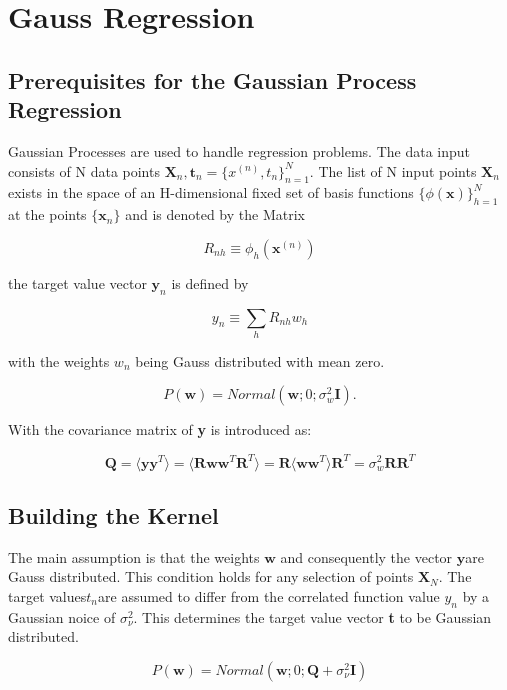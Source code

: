 \section{Gauss Regression}
\label{section:3.2}
\subsection{Prerequisites for the Gaussian Process Regression}
\label{subsection:3.2.1}

Gaussian Processes are used to handle regression problems. The data input consists of N data points $\textbf{X}_n,\textbf{t}_n  = \{x^{(n)},t_n\}_{n=1}^N$. The list of N input points  $\textbf{X}_n$ exists in the space of an H-dimensional fixed set of basis functions $ \{ \phi(\textbf{x})\}_{h=1}^N $ at the points $\{\textbf{x}_n\}$ and is denoted by the Matrix 

$$ 
R_{nh} \equiv  \phi_h(\textbf{x}^{(n)}) 
$$

the target value vector $\textbf{y}_n$ is defined by 

$$
y_n \equiv  \sum_h R_{nh} w_h
$$

with the weights $w_n$ being Gauss distributed with mean zero. 

$$
 P(\textbf{w}) = Normal(\textbf{w};0;\sigma_w^2\textbf{I}). 
$$

With  \cite[540]{GAP-info-theory} the covariance matrix of \textbf{y} is introduced as:

$$
\textbf{Q} 
= 
\langle 
\textbf{y} \textbf{y}^T \rangle 
= 
\langle \textbf{R} \textbf{w} \textbf{w}^T \textbf{R}^T \rangle
= 
\textbf{R} \langle \textbf{w} \textbf{w}^T \rangle \textbf{R}^T 
= 
\sigma_w^2 \textbf{R}  \textbf{R}^T
$$



\subsection{Building the Kernel}
\label{3.2.2}

The main assumption is that the weights $\textbf{w}$ and consequently the vector $\textbf{y} $are Gauss distributed. This condition holds for any selection of points $ \textbf{X}_N $. The target values$ t_n $are assumed to differ from the correlated function value $ y_n$ by a Gaussian noice of $\sigma_\nu^2$. This determines the target value vector \textbf{t} to be Gaussian distributed. 


$$ 
P(\textbf{w}) = Normal(\textbf{w};0;   \textbf{Q}  +  \sigma_\nu^2\textbf{I})
$$

